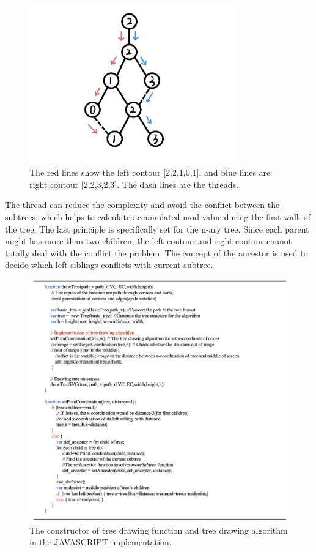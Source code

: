   \begin{figure}[htb]
    \centering
    \includegraphics[width=0.8\textwidth]{../../image/subtree.png}
    \caption{The red lines show the left contour [2,2,1,0,1], and blue lines are right contour [2,2,3,2,3]. The dash lines are the threads.}
    \label{fig:figures:subtree}
  \end{figure}
  \newpage
  The thread can reduce the complexity and avoid the conflict between the subtrees, which helps to calculate accumulated mod value during the first walk of the tree. The last principle is specifically set for the n-ary tree. Since each parent might has more than two children, the left contour and right contour cannot totally deal with the conflict the problem. The concept of the ancestor is used to decide which left siblings conflicts with current subtree.

  \begin{figure}[htb]
    \centering
    \includegraphics[width=1\textwidth]{../../image/drawtree.png}
    \caption{The constructor of tree drawing function and tree drawing algorithm in the JAVASCRIPT implementation.}
    \label{fig:figures:drawtree}
  \end{figure}

